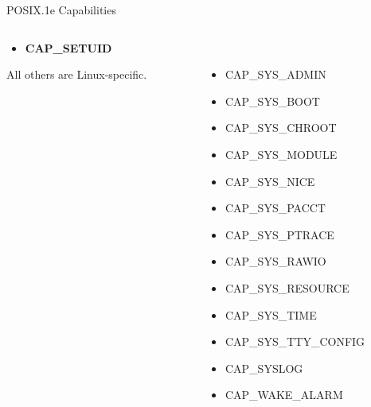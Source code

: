 \documentclass[mathserif,xcolor={dvipsnames,table}]{beamer}
\begin{document}
\begin{frame}{POSIX.1e Capabilities}
{\begin{columns}
\begin{column}{.33\textwidth}
{\begin{itemize}
\item \textbf{CAP\_SETUID}
\end{itemize}
}
All others are Linux-specific.
\end{column}
\begin{column}{.33\textwidth}
{\tt
\begin{itemize}
\item CAP\_SYS\_ADMIN
\item CAP\_SYS\_BOOT
\item CAP\_SYS\_CHROOT
\item CAP\_SYS\_MODULE
\item CAP\_SYS\_NICE
\item CAP\_SYS\_PACCT
\item CAP\_SYS\_PTRACE
\item CAP\_SYS\_RAWIO
\item CAP\_SYS\_RESOURCE
\item CAP\_SYS\_TIME
\item CAP\_SYS\_TTY\_CONFIG
\item CAP\_SYSLOG
\item CAP\_WAKE\_ALARM
\end{itemize}
}
\end{column}
\end{columns}
}
\end{frame}
\end{document}
